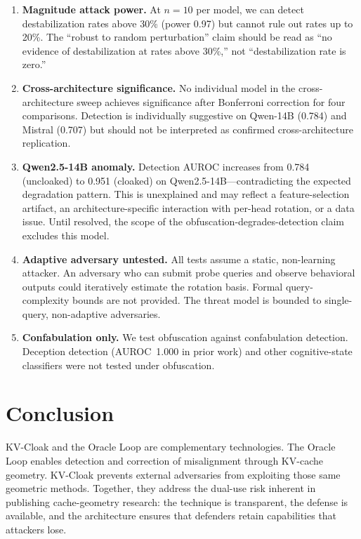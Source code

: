 \documentclass[11pt,a4paper]{article}
\begin{document}
\begin{enumerate}
\item \textbf{Magnitude attack power.} At $n=10$ per model, we can
detect destabilization rates above 30\% (power 0.97) but cannot rule
out rates up to 20\%. The ``robust to random perturbation'' claim should
be read as ``no evidence of destabilization at rates above 30\%,'' not
``destabilization rate is zero.''

\item \textbf{Cross-architecture significance.} No individual model in
the cross-architecture sweep achieves significance after Bonferroni
correction for four comparisons. Detection is individually suggestive on
Qwen-14B (0.784) and Mistral (0.707) but should not be interpreted as
confirmed cross-architecture replication.

\item \textbf{Qwen2.5-14B anomaly.} Detection AUROC increases from
0.784 (uncloaked) to 0.951 (cloaked) on Qwen2.5-14B---contradicting the
expected degradation pattern. This is unexplained and may reflect a
feature-selection artifact, an architecture-specific interaction with
per-head rotation, or a data issue. Until resolved, the scope of the
obfuscation-degrades-detection claim excludes this model.

\item \textbf{Adaptive adversary untested.} All tests assume a static,
non-learning attacker. An adversary who can submit probe queries and
observe behavioral outputs could iteratively estimate the rotation
basis. Formal query-complexity bounds are not provided. The threat model
is bounded to single-query, non-adaptive adversaries.

\item \textbf{Confabulation only.} We test obfuscation against
confabulation detection. Deception detection (AUROC~1.000 in prior
work) and other cognitive-state classifiers were not tested under
obfuscation.
\end{enumerate}

\section{Conclusion}

KV-Cloak and the Oracle Loop are complementary technologies. The Oracle
Loop enables detection and correction of misalignment through
KV-cache geometry. KV-Cloak prevents external adversaries from
exploiting those same geometric methods. Together, they address the
dual-use risk inherent in publishing cache-geometry research: the
technique is transparent, the defense is available, and the architecture
ensures that defenders retain capabilities that attackers lose.
\end{document}
